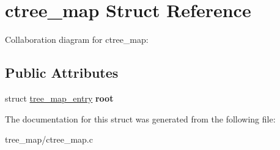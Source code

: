 \hypertarget{structctree__map}{}\section{ctree\+\_\+map Struct Reference}
\label{structctree__map}


Collaboration diagram for ctree\+\_\+map\+:
\subsection*{Public Attributes}
\begin{DoxyCompactItemize}
\item 
\mbox{\label{structctree__map_ab50b235f435c07650d2834c078f3fcff}} 
struct \hyperlink{structtree__map__entry}{tree\+\_\+map\+\_\+entry} {\bfseries root}
\end{DoxyCompactItemize}


The documentation for this struct was generated from the following file\+:\begin{DoxyCompactItemize}
\item 
tree\+\_\+map/ctree\+\_\+map.\+c\end{DoxyCompactItemize}
